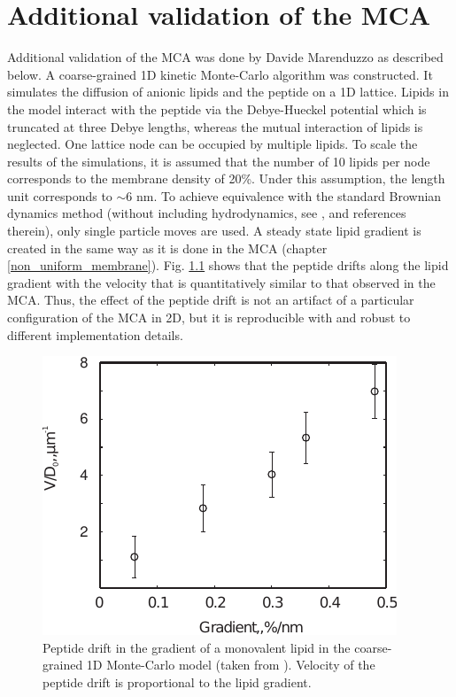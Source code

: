 \chapter{Additional validation of the MCA}

\label{additional_validation}

Additional validation of the MCA was done by Davide Marenduzzo as described below. A coarse-grained 1D kinetic Monte-Carlo algorithm was constructed. It simulates the diffusion of anionic lipids and the peptide on a 1D lattice. Lipids in the model interact with the peptide via the Debye-Hueckel potential which is truncated at three Debye lengths, whereas the mutual interaction of lipids is neglected. One lattice node can be occupied by multiple lipids. To scale the results of the simulations, it is assumed that the number of 10 lipids per node corresponds to the membrane density of 20\%. Under this assumption, the length unit corresponds to $\sim$6 nm. To achieve equivalence with the standard Brownian dynamics method (without including hydrodynamics, see \cite{Sanz2010}, and references therein), only single particle moves are used. A steady state lipid gradient is created in the same way as it is done in the MCA (chapter \ref{non_uniform_membrane}). Fig. \ref{fig:Davide_simulations} shows that the peptide drifts along the lipid gradient with the velocity that is quantitatively similar to that observed in the MCA. Thus, the effect of the peptide drift is not an artifact of a particular configuration of the MCA in 2D, but it is reproducible with and robust to different implementation details.

\begin{figure}[!ht]
\begin{center}
  \includegraphics[scale=1.12]{../figures/Davide_simulations.pdf}
\end{center}
 \caption[Peptide drift in the gradient of a monovalent lipid (1D Monte-Carlo simulation model)]{Peptide drift in the gradient of a monovalent lipid in the coarse-grained 1D Monte-Carlo model (taken from \cite{Kiselev2011}). Velocity of the peptide drift is proportional to the lipid gradient.}
\label{fig:Davide_simulations}
\end{figure}